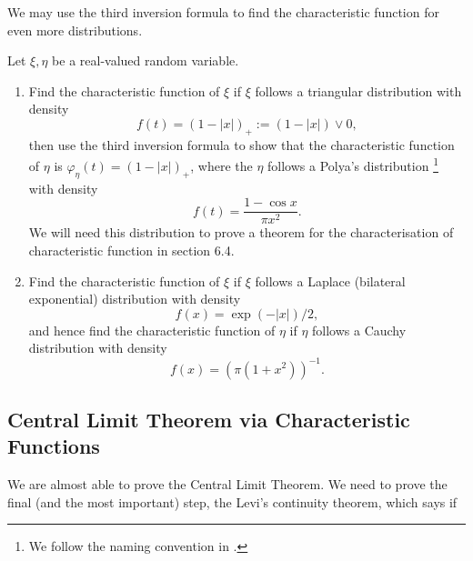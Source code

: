 We may use the third inversion formula to find the characteristic function for even more distributions.
\begin{exercise}
Let $\xi,\eta$ be a real-valued random variable.
\begin{enumerate}
    \item Find the characteristic function of $\xi$ if $\xi$ follows a triangular distribution with density
    \begin{equation}
        f(t) = (1-|x|)_+ := (1-|x|) \vee 0,
    \end{equation}
    then use the third inversion formula to show that the characteristic function of $\eta$ is $\varphi_\eta(t) = (1-|x|)_+$, where the $\eta$ follows a Polya's distribution \footnote{We follow the naming convention in \cite{Durrett}.} with density
    \begin{equation}
        f(t) = \frac{1-\cos x}{\pi x^2}.
    \end{equation}
    We will need this distribution to prove a theorem for the characterisation of characteristic function in section 6.4.
    \item Find the characteristic function of $\xi$ if $\xi$ follows a Laplace (bilateral exponential) distribution with density
    \begin{equation}
        f(x) = \exp(-|x|)/2,
    \end{equation}
    and hence find the characteristic function of $\eta$ if $\eta$ follows a Cauchy distribution with density
    \begin{equation}
        f(x) = (\pi(1+x^2))^{-1}.
    \end{equation}
\end{enumerate}
\end{exercise}

\subsection{Central Limit Theorem via Characteristic Functions}
We are almost able to prove the Central Limit Theorem. We need to prove the final (and the most important) step, the Levi's continuity theorem, which says if 

